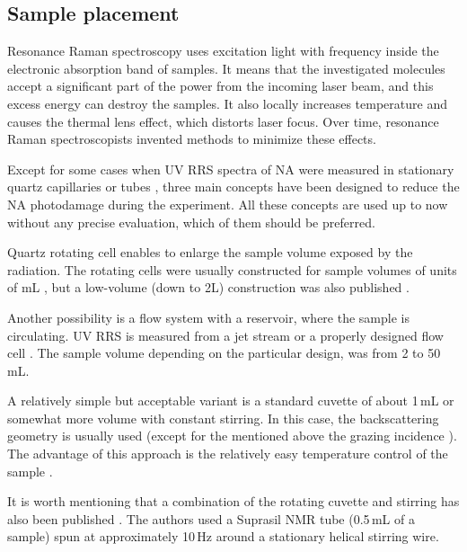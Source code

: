 \subsection{Sample placement}
\label{introduction_sample_placement}

Resonance Raman spectroscopy uses excitation light with frequency inside the
electronic absorption band of samples.
It means that the investigated molecules accept a significant part of the power
from the incoming laser beam, and this excess energy can destroy the samples.
It also locally increases temperature and causes the thermal lens effect, which
distorts laser focus.
Over time, resonance Raman spectroscopists invented methods to minimize these
effects.

Except for some cases when UV RRS spectra of NA were measured in stationary
quartz capillaries or tubes
\parencite{%
	Blazej1977,%
	Asher1983%
},
three main concepts have been designed to reduce the NA photodamage during the
experiment.
All these concepts are used up to now without any precise evaluation, which of
them should be preferred.

Quartz rotating cell enables to enlarge the sample volume exposed by the
radiation.
The rotating cells were usually constructed for sample volumes of units of mL
\parencite{%
	Kiefer1971,%
	Kiefer1971a,%
	Pezolet1973,%
	Nishimura1977,%
	Laigle1982a,%
	Asher1983,%
	Benson1992,%
	Toyama1993,%
	Russell1995%
},
but a low-volume (down to 2L) construction was also published
\parencite{Gfrorer1993a}.

Another possibility is a flow system with a reservoir, where the sample is
circulating.
UV RRS is measured from a jet stream
\parencite{%
	Ziegler1981,%
	Asher1983,%
	Fodor1985,%
	Russell1995,%
	Toyama1993%
}
or a properly designed flow cell
\parencite{%
	Blazej1980,%
	Gfrorer1989%
}.
The sample volume depending on the particular design, was from 2 to 50\,mL.

A relatively simple but acceptable variant is a standard cuvette of about 1\,mL
or somewhat more volume with constant stirring.
In this case, the backscattering geometry is usually used (except for the
mentioned above the grazing incidence
\parencite{Jolles1984}).
The advantage of this approach is the relatively easy temperature control of
the sample
\parencite{Mukerji1995}.

It is worth mentioning that a combination of the rotating cuvette and stirring
has also been published
\parencite{Rodgers1992}.
The authors used a Suprasil NMR tube (0.5\,mL of a sample) spun at
approximately 10\,Hz around a stationary helical stirring wire.
